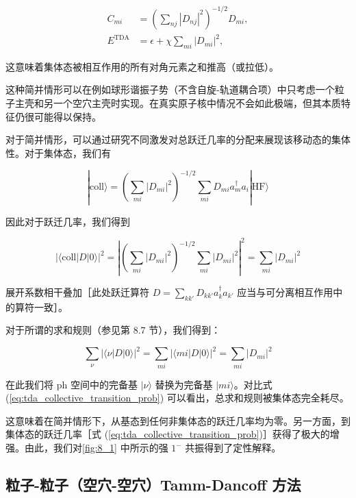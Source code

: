 \begin{align}
C_{mi} & =\left(\sum_{nj}|D_{nj}|^{2}\right)^{-1/2}D_{mi},\nonumber \\
E^{\text{TDA}} & =\epsilon+\chi\sum_{mi}|D_{mi}|^{2},\label{eq:tda_degenerate_solution}
\end{align}

这意味着集体态被相互作用的所有对角元素之和推高（或拉低）。

这种简并情形可以在例如球形谐振子势（不含自旋-轨道耦合项）中只考虑一个粒子主壳和另一个空穴主壳时实现。在真实原子核中情况不会如此极端，但其本质特征仍很可能得以保持。

对于简并情形，可以通过研究不同激发对总跃迁几率的分配来展现该移动态的集体性。对于集体态，我们有

\begin{equation}
|\text{coll}\rangle=\left(\sum_{mi}|D_{mi}|^{2}\right)^{-1/2}\sum_{mi}D_{mi}a^{\dagger}_{m}a_{i}|\text{HF}\rangle\label{eq:tda_collective_state}
\end{equation}

因此对于跃迁几率，我们得到

\begin{equation}
|\langle\text{coll}|D|0\rangle|^{2}=\left|\left(\sum_{mi}|D_{mi}|^{2}\right)^{-1/2}\sum_{mi}|D_{mi}|^{2}\right|^{2}=\sum_{mi}|D_{mi}|^{2}\label{eq:tda_collective_transition_prob}
\end{equation}

展开系数相干叠加［此处跃迁算符 $D=\sum_{kk'}D_{kk'}a^{\dagger}_{k}a_{k'}$ 应当与可分离相互作用中的算符一致］。

对于所谓的求和规则（参见第 8.7 节），我们得到：

\begin{equation}
\sum_{\nu}|\langle\nu|D|0\rangle|^{2}=\sum_{mi}|\langle mi|D|0\rangle|^{2}=\sum_{mi}|D_{mi}|^{2}\label{eq:tda_sum_rule_exhaustion}
\end{equation}

在此我们将 ph 空间中的完备基 $|\nu\rangle$ 替换为完备基 $|mi\rangle$。对比式 (\ref{eq:tda_collective_transition_prob})
可以看出，总求和规则被集体态完全耗尽。

这意味着在简并情形下，从基态到任何非集体态的跃迁几率均为零。另一方面，到集体态的跃迁几率［式 (\ref{eq:tda_collective_transition_prob})］获得了极大的增强。由此，我们对\ref{fig:8_1}
中所示的强 $1^{-}$ 共振得到了定性解释。

\subsection{粒子-粒子（空穴-空穴）Tamm-Dancoff 方法\label{subsec:8.2.3_=007C92=005B50-=007C92=005B50=00FF08=007A7A=007A74-=007A7A=007A74=00FF09Tamm-Dancoff=0065B9=006CD5}}


